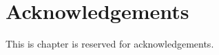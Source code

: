 \chapter{Acknowledgements}

This is chapter is reserved for acknowledgements. \\

\noindent
\Blindtext[2][1]